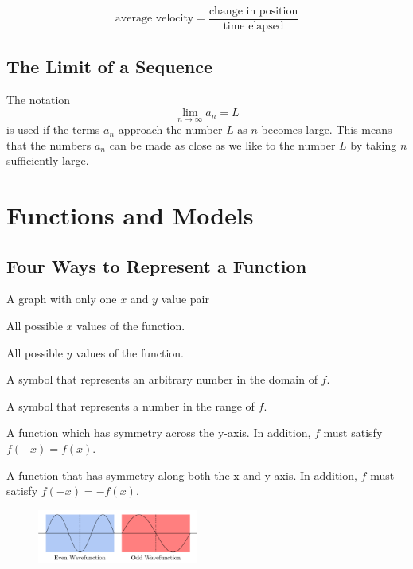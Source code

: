 \documentclass[11pt]{article}
\theoremstyle{plain}
\theoremstyle{definition}
\begin{document}
$$\text{average velocity}=\frac{\text{change in position}}{\text{time elapsed}}$$


\subsection{The Limit of a Sequence}

	The notation $$\lim_{n\to\infty} a_n = L$$ is used if the terms $a_n$ approach the number $L$ as $n$ becomes large. This means that the numbers $a_n$ can be made as close as we like to the number $L$ by taking $n$ sufficiently large.


\section{Functions and Models}

\subsection{Four Ways to Represent a Function}

\begin{description}[style=nextline]
	\item[Function] A graph with only one $x$ and $y$ value pair
   	\item[Domain] All possible $x$ values of the function.
  	\item[Range] All possible $y$ values of the function.
  	\item[Independent variable] A symbol that represents an arbitrary number in the domain of $f$.
  	\item[Dependent variable] A symbol that represents a number in the range of $f$.
  	\item[Even function] A function which has symmetry across the y-axis. In addition, $f$ must satisfy $f(-x)=f(x)$.
  	\item[Odd function] A function that has symmetry along both the x and y-axis. In addition, $f$ must satisfy $f(-x)=-f(x)$.
\end{description}

\begin{figure}[h]
	\includegraphics[width=200px]{images/Even_vs_Odd_Parity}	
\end{figure}
\end{document}
